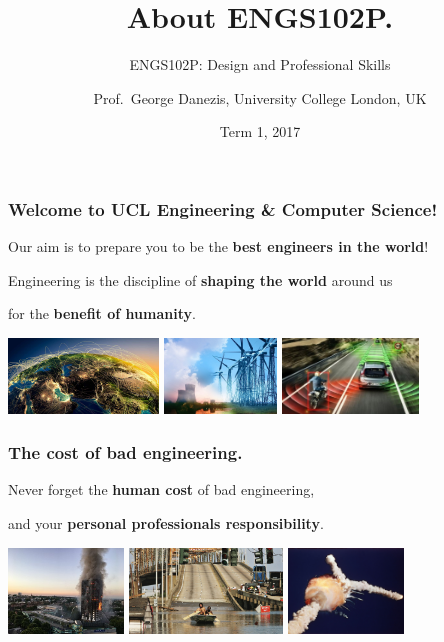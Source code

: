 \documentclass{beamer} %
\author{Prof.\ George Danezis, University College London, UK}
\title{About ENGS102P.}
\subtitle{ENGS102P: Design and Professional Skills }
\date{Term 1, 2017}
\newcommand\emc[1]{\textcolor{brightblue}{\textbf{#1}}}
\begin{document}
\nobibliography*


\frame{
\titlepage
}


\begin{frame}
\frametitle{Welcome to UCL Engineering \& Computer Science!}

Our aim is to prepare you to be the \emc{best engineers in the world}!

\vspace{10mm}
Engineering is the discipline of \emc{shaping the world} around us 

for the \emc{benefit of humanity}.

\vspace{5mm}
\centering
\includegraphics[height=20mm]{img/internet.jpg} \quad
\includegraphics[height=20mm]{img/power.jpg} \quad
\includegraphics[height=20mm]{img/cars.jpg}

\end{frame}

\begin{frame}
\frametitle{The cost of bad engineering.}

Never forget the \emc{human cost} of bad engineering, 

and your \emc{personal professionals responsibility}.

\vspace{10mm}
\centering
\includegraphics[height=23mm]{img/Grenfell.jpg} \quad
\includegraphics[height=23mm]{img/katrina.jpg} \quad
\includegraphics[height=23mm]{img/challenger.jpg}

\end{frame}
\end{document}
